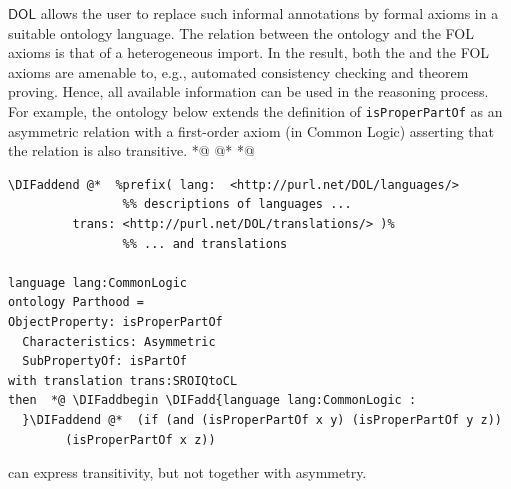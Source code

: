 \documentclass[10pt,fleqn,final]{scrreprt}
\newcommand*{\DOL}{\ensuremath{\mathsf{DOL}}\xspace}
\newenvironment{definitions}[0]{\medskip }{}
\providecommand{\DIFadd}[1]{{\protect\color{blue}\uwave{#1}}} %
\providecommand{\DIFaddbegin}{} %
\providecommand{\DIFaddend}{} %
\providecommand{\DIFdelbegin}{} %
\providecommand{\DIFdelend}{} %
\begin{document}
\begin{definitions}
\DOL allows the user to replace such informal annotations by formal axioms in a suitable ontology 
language. The relation between the \OWL ontology and the FOL axioms is that of a heterogeneous 
import. In the result, both the \OWL and the FOL axioms are amenable to, e.g., automated consistency 
checking and theorem proving. Hence, all available information can be used in the reasoning process.
For example, the ontology below extends the \OWL definition of \texttt{isProperPartOf} as an asymmetric relation
with a first-order axiom (in Common Logic) asserting that the relation is also transitive.
 *@ \DIFdelbegin %
\DIFdelend @*   *@ \DIFaddbegin \begin{lstlisting}[basicstyle=\small\ttfamily,language=dolText,alsolanguage=clif,alsolanguage=owl2Manchester,escapechar=@,mathescape]
\DIFaddend @*  %prefix( lang:  <http://purl.net/DOL/languages/>
                %% descriptions of languages ...
         trans: <http://purl.net/DOL/translations/> )%
                %% ... and translations

language lang:CommonLogic
ontology Parthood =
ObjectProperty: isProperPartOf  
  Characteristics: Asymmetric  
  SubPropertyOf: isPartOf 
with translation trans:SROIQtoCL
then  *@ \DIFaddbegin \DIFadd{language lang:CommonLogic :
  }\DIFaddend @*  (if (and (isProperPartOf x y) (isProperPartOf y z)) 
        (isProperPartOf x z))
\end{lstlisting}
\OWL can express transitivity, but not together with asymmetry.


\end{definitions}
\end{document}
